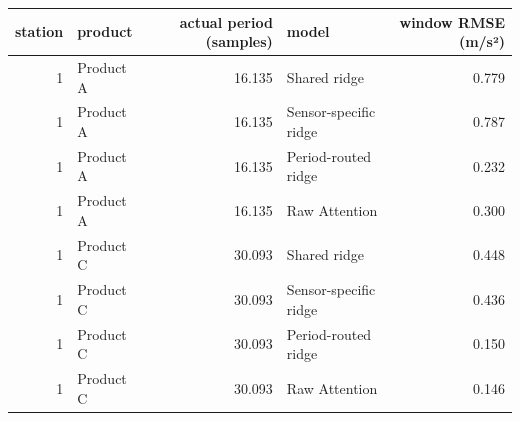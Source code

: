 \begin{tabular}{rlrlr}
\toprule
station & product & actual period (samples) & model & window RMSE (m/s²) \\
\midrule
1 & Product A & 16.135 & Shared ridge & 0.779 \\
1 & Product A & 16.135 & Sensor-specific ridge & 0.787 \\
1 & Product A & 16.135 & Period-routed ridge & 0.232 \\
1 & Product A & 16.135 & Raw Attention & 0.300 \\
1 & Product C & 30.093 & Shared ridge & 0.448 \\
1 & Product C & 30.093 & Sensor-specific ridge & 0.436 \\
1 & Product C & 30.093 & Period-routed ridge & 0.150 \\
1 & Product C & 30.093 & Raw Attention & 0.146 \\
\bottomrule
\end{tabular}
